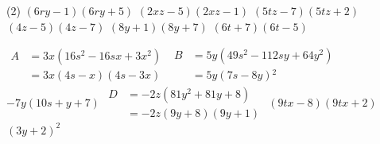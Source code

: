 \documentclass[a4paper,12pt]{report}
\begin{document}
\vspace*{-2\baselineskip}

\begin{core}\phantom{ }

\begin{tasks}(2)
\task ${{\left(6 r y-1\right)\left(6 r y+5 \right)}}$
\task ${{\left(2 x z-5 \right)\left(2 x z-1\right)}}$
\task ${{\left(5 t z-7 \right)\left(5 t z+2 \right)}}$
\task ${{\left(4 z-5 \right)\left(4 z-7 \right)}}$
\task ${{\left(8 y+1\right)\left(8 y+7 \right)}}$
\task ${{\left(6 t+7 \right)\left(6 t-5 \right)}}$
\end{tasks}

\end{core}

\begin{core}\phantom{ }

\begin{tasks}
\task $\begin{aligned}A&={{3 x}}\mathopen{}\left(16 s^2-16 s x + 3 x^2\right)\mathclose{}\\&={{3 x\mathopen{}\left(4 s-x\right)\mathclose{}\mathopen{}\left(4 s-3 x\right)\mathclose{}}}\end{aligned}$
\task $\begin{aligned}B&={{5 y}}\mathopen{}\left(49 s^2-112 s y + 64 y^2\right)\mathclose{}\\&={{5 y\mathopen{}\left(7 s-8 y\right)\mathclose{}^2}}\end{aligned}$
\task ${{-7 y(10 s + y + 7 )}}$
\task $\begin{aligned}D&={{-2 z}}\mathopen{}\left(81 y^2 + 81 y + 8 \right)\mathclose{}\\&={{-2 z\mathopen{}\left(9 y+8 \right)\mathclose{}\mathopen{}\left(9 y+1\right)\mathclose{}}}\end{aligned}$
\task ${{\left(9 t x-8 \right)\left(9 t x+2 \right)}}$
\task ${{\left(3 y+2 \right)^2}}$
\end{tasks}

\end{core}
\end{document}
